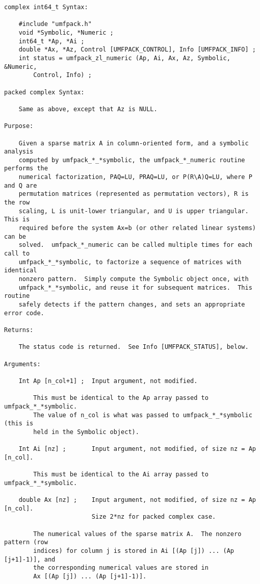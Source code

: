 \documentclass[11pt]{article}
\begin{document}
{\begin{verbatim}
complex int64_t Syntax:

    #include "umfpack.h"
    void *Symbolic, *Numeric ;
    int64_t *Ap, *Ai ;
    double *Ax, *Az, Control [UMFPACK_CONTROL], Info [UMFPACK_INFO] ;
    int status = umfpack_zl_numeric (Ap, Ai, Ax, Az, Symbolic, &Numeric,
        Control, Info) ;

packed complex Syntax:

    Same as above, except that Az is NULL.

Purpose:

    Given a sparse matrix A in column-oriented form, and a symbolic analysis
    computed by umfpack_*_*symbolic, the umfpack_*_numeric routine performs the
    numerical factorization, PAQ=LU, PRAQ=LU, or P(R\A)Q=LU, where P and Q are
    permutation matrices (represented as permutation vectors), R is the row
    scaling, L is unit-lower triangular, and U is upper triangular.  This is
    required before the system Ax=b (or other related linear systems) can be
    solved.  umfpack_*_numeric can be called multiple times for each call to
    umfpack_*_*symbolic, to factorize a sequence of matrices with identical
    nonzero pattern.  Simply compute the Symbolic object once, with
    umfpack_*_*symbolic, and reuse it for subsequent matrices.  This routine
    safely detects if the pattern changes, and sets an appropriate error code.

Returns:

    The status code is returned.  See Info [UMFPACK_STATUS], below.

Arguments:

    Int Ap [n_col+1] ;  Input argument, not modified.

        This must be identical to the Ap array passed to umfpack_*_*symbolic.
        The value of n_col is what was passed to umfpack_*_*symbolic (this is
        held in the Symbolic object).

    Int Ai [nz] ;       Input argument, not modified, of size nz = Ap [n_col].

        This must be identical to the Ai array passed to umfpack_*_*symbolic.

    double Ax [nz] ;    Input argument, not modified, of size nz = Ap [n_col].
                        Size 2*nz for packed complex case.

        The numerical values of the sparse matrix A.  The nonzero pattern (row
        indices) for column j is stored in Ai [(Ap [j]) ... (Ap [j+1]-1)], and
        the corresponding numerical values are stored in
        Ax [(Ap [j]) ... (Ap [j+1]-1)].


\end{verbatim}}
\end{document}
